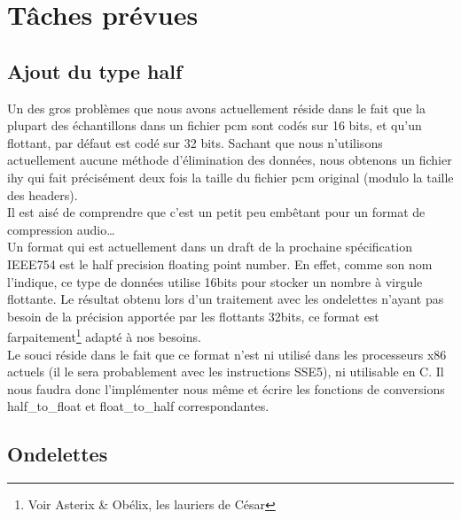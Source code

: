 \documentclass[a4paper,12pt]{article}
\begin{document}
\section{Tâches prévues}

	\subsection{Ajout du type half}
Un des gros problèmes que nous avons actuellement réside dans le fait que la
plupart des échantillons dans un fichier pcm sont codés sur 16 bits, et qu'un
flottant, par défaut est codé sur 32 bits. Sachant que nous n'utilisons
actuellement aucune méthode d'élimination des données, nous obtenons un
fichier ihy qui fait précisément deux fois la taille du fichier pcm original
(modulo la taille des headers).\\
Il est aisé de comprendre que c'est un petit peu embêtant pour un format de
compression audio\ldots\\
Un format qui est actuellement dans un draft de la prochaine spécification
IEEE754 est le half precision floating point number. En effet, comme son nom
l'indique, ce type de données utilise 16bits pour stocker un nombre à virgule
flottante. Le résultat obtenu lors d'un traitement avec les ondelettes n'ayant
pas besoin de la précision apportée par les flottants 32bits, ce format est
farpaitement\footnote{Voir Asterix \& Obélix, les lauriers de César} adapté à nos
besoins.\\
Le souci réside dans le fait que ce format n'est ni utilisé dans les processeurs
x86 actuels (il le sera probablement avec les instructions SSE5), ni utilisable
en C. Il nous faudra donc l'implémenter nous même et écrire les fonctions de
conversions half\_to\_float et float\_to\_half correspondantes.

	\subsection{Ondelettes}
\end{document}
